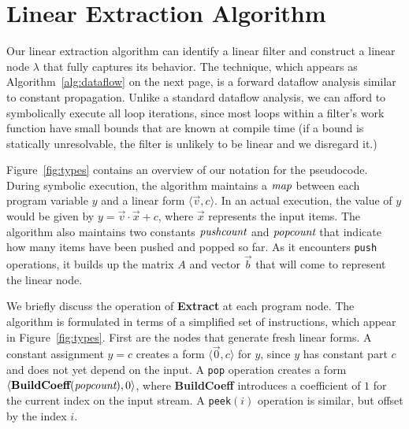 \newcommand{\la}{$\leftarrow$}
\newcommand{\IND}{\begin{ALC@g}}
\newcommand{\UND}{\end{ALC@g}}
\newcommand{\tup}[2]{\langle{#1}, {#2}\rangle}

\section{Linear Extraction Algorithm}
\label{sec:dataflow}

Our linear extraction algorithm can identify a linear filter and
construct a linear node $\lambda$ that fully captures its behavior.
The technique, which appears as Algorithm~\ref{alg:dataflow} on the
next page, is a forward dataflow analysis similar to constant
propagation.  Unlike a standard dataflow analysis, we can afford to
symbolically execute all loop iterations, since most loops within a
filter's work function have small bounds that are known at compile
time (if a bound is statically unresolvable, the filter is unlikely to
be linear and we disregard it.)

Figure~\ref{fig:types} contains an overview of our notation for the
pseudocode.  During symbolic execution, the algorithm maintains a
$\mbox{\it map}$ between each program variable $y$ and a linear form
$\tup{{\vec v}}{c}$. In an actual execution, the value of $y$ would be
given by $y = {\vec v} \cdot {\vec x} + c$, where ${\vec x}$
represents the input items.  The algorithm also maintains two
constants $\mbox{\it pushcount}$ and $\mbox{\it popcount}$ that indicate how many
items have been pushed and popped so far.  As it encounters {\tt push}
operations, it builds up the matrix $A$ and vector ${\vec b}$ that
will come to represent the linear node.

We briefly discuss the operation of {\bf Extract} at each program
node.  The algorithm is formulated in terms of a simplified set of
instructions, which appear in Figure~\ref{fig:types}.  First are the
nodes that generate fresh linear forms.  A constant assignment $y = c$
creates a form $\tup{\vec 0}{c}$ for $y$, since $y$ has constant part
$c$ and does not yet depend on the input.  A {\tt pop} operation
creates a form $\tup{\mbox{\bf BuildCoeff}(\mt{popcount})}{0}$, where
{\bf BuildCoeff} introduces a coefficient of $1$ for the current index
on the input stream.  A {\tt peek}$(i)$ operation is similar, but
offset by the index $i$.


